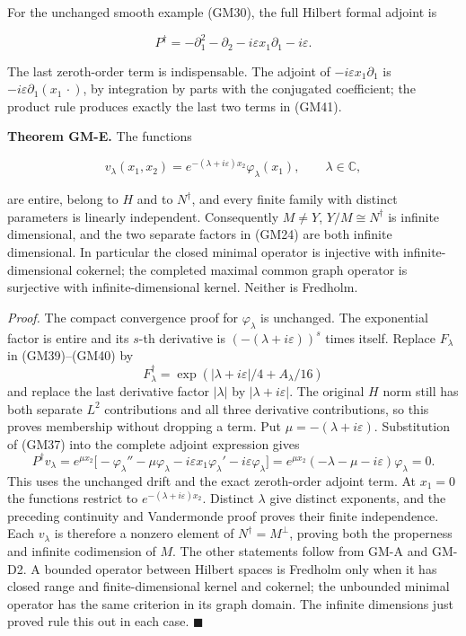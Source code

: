 \documentclass[
  11pt,
]{article}
\begin{document}
For the unchanged smooth example (GM30), the full Hilbert formal adjoint
is

\[
 P^\dagger=-\partial_1^2-\partial_2
            -i\varepsilon x_1\partial_1-i\varepsilon.
 \tag{GM41}
\]

The last zeroth-order term is indispensable. The adjoint of
\(-i\varepsilon x_1\partial_1\) is \(-i\varepsilon\partial_1(x_1\,\cdot)\), by integration
by parts with the conjugated coefficient; the product rule produces
exactly the last two terms in (GM41).

\textbf{Theorem GM-E.} The functions

\[
 v_\lambda(x_1,x_2)
      =e^{-(\lambda+i\varepsilon)x_2}\varphi_\lambda(x_1),
 \qquad \lambda\in\mathbb C,
 \tag{GM42}
\]

are entire, belong to \(H\) and to
\(N^\dagger\), and every finite family with distinct
parameters is linearly independent. Consequently
\(M\neq Y\), \(Y/M\cong N^\dagger\) is infinite
dimensional, and the two separate factors in (GM24) are both infinite
dimensional. In particular the closed minimal operator is injective with
infinite-dimensional cokernel; the completed maximal common graph
operator is surjective with infinite-dimensional kernel. Neither is
Fredholm.

\emph{Proof.} The compact convergence proof for
\(\varphi_\lambda\) is unchanged. The exponential factor is
entire and its \(s\)-th derivative is
\((-(\lambda+i\varepsilon))^s\) times itself. Replace
\(F_\lambda\) in (GM39)--(GM40) by
\[
 F^\dagger_\lambda
      =\exp\left(|\lambda+i\varepsilon|/4+A_\lambda/16\right)
\] and replace the last derivative factor
\(|\lambda|\) by \(|\lambda+i\varepsilon|\). The original
\(H\) norm still has both separate
\(L^2\) contributions and all three derivative
contributions, so this proves membership without dropping a term. Put
\(\mu=-(\lambda+i\varepsilon)\). Substitution of (GM37) into the complete
adjoint expression gives \[
 P^\dagger v_\lambda=e^{\mu x_2}
       \big[-\varphi_\lambda''-\mu\varphi_\lambda
              -i\varepsilon x_1\varphi_\lambda'-i\varepsilon\varphi_\lambda\big]
   =e^{\mu x_2}(-\lambda-\mu-i\varepsilon)\varphi_\lambda=0.
 \tag{GM43}
\] This uses the
unchanged drift and the exact zeroth-order adjoint term. At
\(x_1=0\) the functions restrict to
\(e^{-(\lambda+i\varepsilon)x_2}\). Distinct \(\lambda\) give
distinct exponents, and the preceding continuity and Vandermonde proof
proves their finite independence. Each \(v_\lambda\) is
therefore a nonzero element of \(N^\dagger=M^\perp\), proving both
the properness and infinite codimension of \(M\).
The other statements follow from GM-A and GM-D2. A bounded operator
between Hilbert spaces is Fredholm only when it has closed range and
finite-dimensional kernel and cokernel; the unbounded minimal operator
has the same criterion in its graph domain. The infinite dimensions just
proved rule this out in each case. \hfill\ensuremath{\blacksquare}
\end{document}

